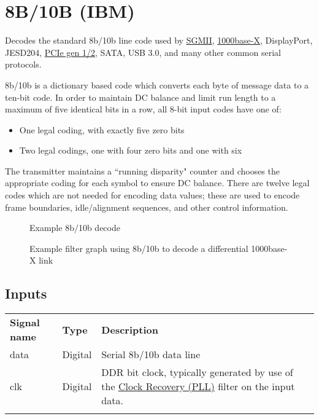 \pagebreak
\section{8B/10B (IBM)}
\label{filter:8b10b}

Decodes the standard 8b/10b line code used by \hyperref[filter:sgmii]{SGMII}, \hyperref[filter:1000basex]{1000base-X},
DisplayPort, JESD204, \hyperref[filter:pcie2_logical]{PCIe gen 1/2}, SATA, USB 3.0, and many other common serial
protocols.

8b/10b is a dictionary based code which converts each byte of message data to a ten-bit code. In order to maintain DC
balance and limit run length to a maximum of five identical bits in a row, all 8-bit input codes have one of:
\begin{itemize}
\item One legal coding, with exactly five zero bits
\item Two legal codings, one with four zero bits and one with six
\end{itemize}

The transmitter maintains a ``running disparity" counter and chooses the appropriate coding for each symbol to ensure
DC balance. There are twelve legal codes which are not needed for encoding data values; these are used to encode
frame boundaries, idle/alignment sequences, and other control information.

\begin{figure}[h]
\centering
{}
\caption{Example 8b/10b decode}
\label{filter_8b10b}
\end{figure}

\begin{figure}[h]
\centering
{}
\caption{Example filter graph using 8b/10b to decode a differential 1000base-X link}
\label{filter_graph_8b10b}
\end{figure}

\subsection{Inputs}

\begin{tabularx}{16cm}{llX}
\thickhline
\textbf{Signal name} & \textbf{Type} & \textbf{Description} \\
\thickhline
data & Digital & Serial 8b/10b data line \\
\thinhline
clk & Digital & DDR bit clock, typically generated by use of the \hyperref[filter:cdrpll]{Clock Recovery
(PLL)} filter on the input data.\\
\thickhline
\end{tabularx}

